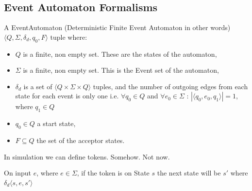 		\subsection{Event Automaton Formalisms}
			\begin{dfn}
				\label{dfn:cep:dfea}
				A EventAutomaton (Deterministic Finite Event Automaton in other words) $\langle Q,\Sigma,\delta_d,q_0, F \rangle$ tuple where: %
					\begin{itemize}
						\item $Q$ is a finite, non empty set. These are the states of the automaton,
						\item $\Sigma$ is a finite, non empty set. This is the Event set of the automaton,
						\item $\delta_d$ is a set of $\langle Q \times \Sigma \times Q \rangle$ tuples,
							and the number of outgoing edges from each state for each event is only one 
							i.e. $\forall q_0 \in Q$ and $\forall e_0 \in \Sigma$ : $|\langle q_0, e_0, q_1 \rangle| = 1$, where $q_1 \in Q$ 
						\item $q_0 \in Q$ a start state,
						\item $F \subseteq Q$ the set of the acceptor states.
					\end{itemize}
				
			\end{dfn}
			
			In simulation we can define tokens. Somehow. Not now. %
			
			
			On input $e$, where $e \in \Sigma$, if the token is on State $s$ the next state will be $s'$ where 
			$\delta_d \langle s,e,s' \rangle$ 
			
			
			

